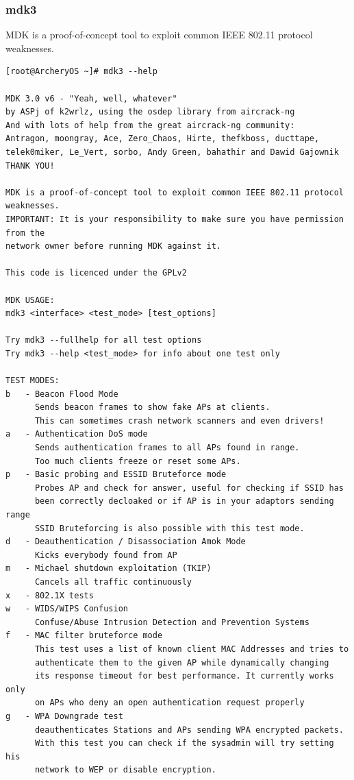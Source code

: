\documentclass{article}
\begin{document}
\subsubsection{mdk3}
 MDK  is  a proof-of-concept tool to exploit common IEEE 802.11 protocol weaknesses.
\begin{lstlisting}
[root@ArcheryOS ~]# mdk3 --help

MDK 3.0 v6 - "Yeah, well, whatever"
by ASPj of k2wrlz, using the osdep library from aircrack-ng
And with lots of help from the great aircrack-ng community:
Antragon, moongray, Ace, Zero_Chaos, Hirte, thefkboss, ducttape,
telek0miker, Le_Vert, sorbo, Andy Green, bahathir and Dawid Gajownik
THANK YOU!

MDK is a proof-of-concept tool to exploit common IEEE 802.11 protocol weaknesses.
IMPORTANT: It is your responsibility to make sure you have permission from the
network owner before running MDK against it.

This code is licenced under the GPLv2

MDK USAGE:
mdk3 <interface> <test_mode> [test_options]

Try mdk3 --fullhelp for all test options
Try mdk3 --help <test_mode> for info about one test only

TEST MODES:
b   - Beacon Flood Mode
      Sends beacon frames to show fake APs at clients.
      This can sometimes crash network scanners and even drivers!
a   - Authentication DoS mode
      Sends authentication frames to all APs found in range.
      Too much clients freeze or reset some APs.
p   - Basic probing and ESSID Bruteforce mode
      Probes AP and check for answer, useful for checking if SSID has
      been correctly decloaked or if AP is in your adaptors sending range
      SSID Bruteforcing is also possible with this test mode.
d   - Deauthentication / Disassociation Amok Mode
      Kicks everybody found from AP
m   - Michael shutdown exploitation (TKIP)
      Cancels all traffic continuously
x   - 802.1X tests
w   - WIDS/WIPS Confusion
      Confuse/Abuse Intrusion Detection and Prevention Systems
f   - MAC filter bruteforce mode
      This test uses a list of known client MAC Addresses and tries to
      authenticate them to the given AP while dynamically changing
      its response timeout for best performance. It currently works only
      on APs who deny an open authentication request properly
g   - WPA Downgrade test
      deauthenticates Stations and APs sending WPA encrypted packets.
      With this test you can check if the sysadmin will try setting his
      network to WEP or disable encryption.
\end{lstlisting}
\end{document}
